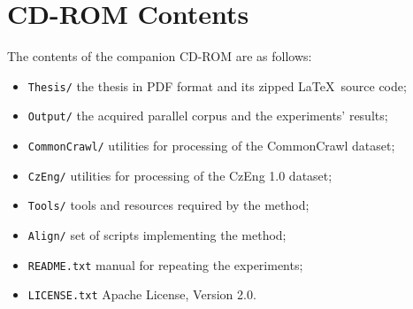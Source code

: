 
\chapter{CD-ROM Contents}

The contents of the companion CD-ROM are as follows:

\begin{itemize}
	\item \texttt{Thesis/} \quad the thesis in PDF format and its zipped \LaTeX\ source code;
	\item \texttt{Output/} \quad the acquired parallel corpus and the experiments' results;
	\item \texttt{CommonCrawl/} \quad utilities for processing of the CommonCrawl dataset;
	\item \texttt{CzEng/} \quad utilities for processing of the CzEng 1.0 dataset;
	\item \texttt{Tools/} \quad tools and resources required by the method;
	\item \texttt{Align/} \quad set of scripts implementing the method;
	\item \texttt{README.txt} \quad manual for repeating the experiments;
	\item \texttt{LICENSE.txt} \quad Apache License, Version 2.0.
\end{itemize}